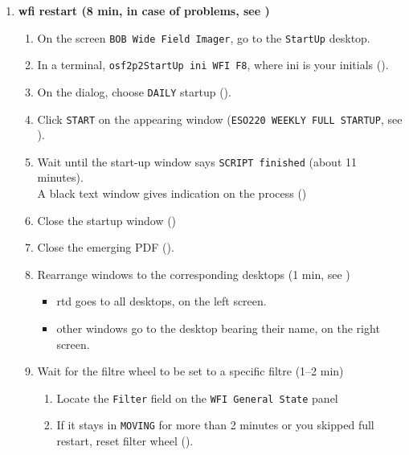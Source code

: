 \documentclass[11pt,fleqn,a4paper]{book}
\begin{document}
\bigskip
{} 
\label{proc:startup}
\begin{enumerate}
  \item \label{list:wfistartup}\textbf{\gls{wfi} restart (8 min, in case of problems, see )}
        \begin{enumerate}
          \item On the screen \texttt{BOB Wide Field Imager}, go to the \texttt{StartUp} \gls{desktop}.\label{list:wfi1}
          \item In a terminal, \texttt{\gls{osf2p2StartUp} ini WFI F8}, where ini is your initials ().
          \item On the dialog, choose \texttt{DAILY} startup ().
          \item Click \texttt{START} on the appearing window (\texttt{ESO220 WEEKLY FULL STARTUP}, see ). 
          \item Wait until the start-up window says \texttt{SCRIPT finished} (about 11 minutes).\\
          A black text window gives indication on the process ()
                \label{list:wfibooted}
          \item Close the startup window ()
          \item Close the emerging PDF ().
          \item Rearrange windows to the corresponding \gls{desktop}s (1 min, see )
             \label{list:wfiwin}
             \begin{itemize}
                \item \gls{rtd} goes to all \gls{desktop}s, on the left screen.
                \item other windows go to the \gls{desktop} bearing their name, on the right screen. 
            \end{itemize}
          \item Wait for the filtre wheel to be set to a specific filtre (1--2 min)\label{list:wfisu-filtre}
                \begin{enumerate}
                    \item Locate the \texttt{Filter} field on the \texttt{WFI \gls{General State}} panel
                    \item If it stays in \texttt{MOVING} for more than 2 minutes or you skipped full restart, reset filter wheel (). 

\end{enumerate}
\end{enumerate}
\end{enumerate}
\end{document}
